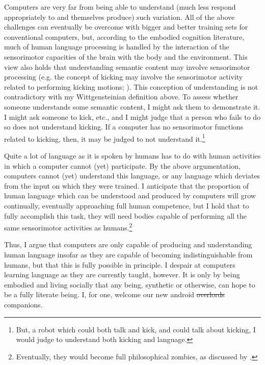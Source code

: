 \documentclass[man,12pt,natbib]{apa6}
\begin{document}
Computers are very far from being able to understand (much less respond
appropriately to and themselves produce) such variation.  All of the above
challenges can eventually be overcome with bigger and better training sets for
conventional computers, but, according to the embodied cognition literature,
much of human language processing is handled by the interaction of the
sensorimotor capacities of the brain with the body and the environment. This
view also holds that understanding semantic content may involve sensorimotor
processing (e.g.  the concept of kicking may involve the sensorimotor activity
related to performing kicking motions; \citealp{Rueschemeyer10}).  This
conception of understanding is not contradictory with my Wittgensteinian
definition above. To assess whether someone understands some semantic content,
I might ask them to demonstrate it.  I might ask someone to kick, etc., and I
might judge that a person who fails to do so does not understand kicking. If a
computer has no sensorimotor functions related to kicking, then, it may be
judged to not understand it.\footnote{But, a robot which could both talk and
kick, and could talk about kicking, I would judge to understand both kicking
and language.}

Quite a lot of language as it is spoken by humans has to do with human
activities in which a computer cannot (yet) participate. By the above
argumentation, computers cannot (yet) understand this language, or any language
which deviates from the input on which they were trained. I anticipate that the
proportion of human language which can be understood and produced by computers
will grow continually, eventually approaching full human competence, but I hold
that to fully accomplish this task, they will need bodies capable of performing
all the same sensorimotor activities as humans.\footnote{Eventually, they would
become full philosophical zombies, as discussed by \citet{Chalmers96}.}

Thus, I argue that computers are only capable of producing and understanding
human language insofar as they are capable of becoming indistinguishable from
humans, but that this is fully possible in principle. I despair at computers
learning language as they are currently taught, however. It is only by being
embodied and living socially that any being, synthetic or otherwise, can hope
to be a fully literate being. I, for one, welcome our new android
\st{overlords} companions.

\clearpage

\end{document}
